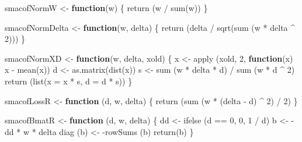 \documentclass[
  12pt,
  letterpaper,
  DIV=11,
  numbers=noendperiod]{scrreprt}
\newenvironment{Shaded}{\begin{snugshade}}{\end{snugshade}}
\newcommand{\AttributeTok}[1]{\textcolor[rgb]{0.40,0.45,0.13}{#1}}
\newcommand{\ControlFlowTok}[1]{\textcolor[rgb]{0.00,0.23,0.31}{\textbf{#1}}}
\newcommand{\DecValTok}[1]{\textcolor[rgb]{0.68,0.00,0.00}{#1}}
\newcommand{\FunctionTok}[1]{\textcolor[rgb]{0.28,0.35,0.67}{#1}}
\newcommand{\NormalTok}[1]{\textcolor[rgb]{0.00,0.23,0.31}{#1}}
\newcommand{\OtherTok}[1]{\textcolor[rgb]{0.00,0.23,0.31}{#1}}
\newcommand{\SpecialCharTok}[1]{\textcolor[rgb]{0.37,0.37,0.37}{#1}}
\theoremstyle{remark}
\begin{document}
\begin{Shaded}
\begin{Highlighting}[]
\NormalTok{smacofNormW }\OtherTok{\textless{}{-}} \ControlFlowTok{function}\NormalTok{(w) \{}
  \FunctionTok{return}\NormalTok{ (w }\SpecialCharTok{/} \FunctionTok{sum}\NormalTok{(w))}
\NormalTok{\}}

\NormalTok{smacofNormDelta }\OtherTok{\textless{}{-}} \ControlFlowTok{function}\NormalTok{(w, delta) \{}
  \FunctionTok{return}\NormalTok{ (delta }\SpecialCharTok{/} \FunctionTok{sqrt}\NormalTok{(}\FunctionTok{sum}\NormalTok{ (w }\SpecialCharTok{*}\NormalTok{ delta }\SpecialCharTok{\^{}} \DecValTok{2}\NormalTok{)))}
\NormalTok{\}}

\NormalTok{smacofNormXD }\OtherTok{\textless{}{-}} \ControlFlowTok{function}\NormalTok{(w, delta, xold) \{}
\NormalTok{  x }\OtherTok{\textless{}{-}} \FunctionTok{apply}\NormalTok{ (xold, }\DecValTok{2}\NormalTok{, }\ControlFlowTok{function}\NormalTok{(x)}
\NormalTok{    x }\SpecialCharTok{{-}} \FunctionTok{mean}\NormalTok{(x))}
\NormalTok{  d }\OtherTok{\textless{}{-}} \FunctionTok{as.matrix}\NormalTok{(}\FunctionTok{dist}\NormalTok{(x))}
\NormalTok{  s }\OtherTok{\textless{}{-}} \FunctionTok{sum}\NormalTok{ (w }\SpecialCharTok{*}\NormalTok{ delta }\SpecialCharTok{*}\NormalTok{ d) }\SpecialCharTok{/} \FunctionTok{sum}\NormalTok{ (w }\SpecialCharTok{*}\NormalTok{ d }\SpecialCharTok{\^{}} \DecValTok{2}\NormalTok{)}
  \FunctionTok{return}\NormalTok{ (}\FunctionTok{list}\NormalTok{(}\AttributeTok{x =}\NormalTok{ x }\SpecialCharTok{*}\NormalTok{ s, }\AttributeTok{d =}\NormalTok{ d }\SpecialCharTok{*}\NormalTok{ s))}
\NormalTok{\}}

\NormalTok{smacofLossR }\OtherTok{\textless{}{-}} \ControlFlowTok{function}\NormalTok{ (d, w, delta) \{}
  \FunctionTok{return}\NormalTok{ (}\FunctionTok{sum}\NormalTok{ (w }\SpecialCharTok{*}\NormalTok{ (delta }\SpecialCharTok{{-}}\NormalTok{ d) }\SpecialCharTok{\^{}} \DecValTok{2}\NormalTok{) }\SpecialCharTok{/} \DecValTok{2}\NormalTok{)}
\NormalTok{\}}

\NormalTok{smacofBmatR }\OtherTok{\textless{}{-}} \ControlFlowTok{function}\NormalTok{ (d, w, delta) \{}
\NormalTok{  dd }\OtherTok{\textless{}{-}} \FunctionTok{ifelse}\NormalTok{ (d }\SpecialCharTok{==} \DecValTok{0}\NormalTok{, }\DecValTok{0}\NormalTok{, }\DecValTok{1} \SpecialCharTok{/}\NormalTok{ d)}
\NormalTok{  b }\OtherTok{\textless{}{-}} \SpecialCharTok{{-}}\NormalTok{dd }\SpecialCharTok{*}\NormalTok{ w }\SpecialCharTok{*}\NormalTok{ delta}
  \FunctionTok{diag}\NormalTok{ (b) }\OtherTok{\textless{}{-}} \SpecialCharTok{{-}}\FunctionTok{rowSums}\NormalTok{ (b)}
  \FunctionTok{return}\NormalTok{(b)}
\NormalTok{\}}


\end{Highlighting}
\end{Shaded}
\end{document}
